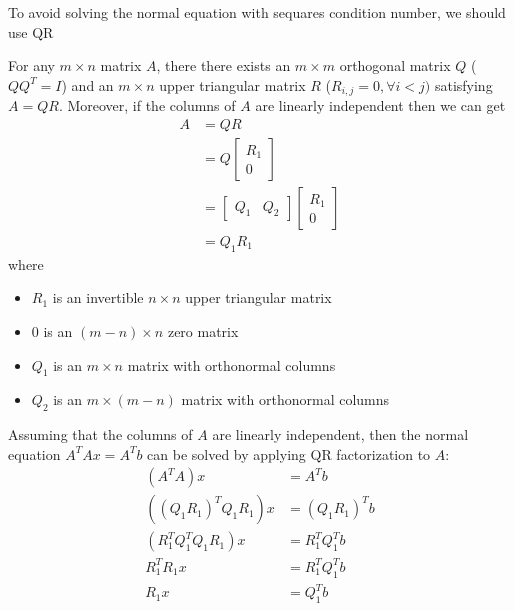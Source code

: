   To avoid solving the normal equation with sequares condition number, we should use QR
  
  
  

  
\begin{definition}[QR Factorization]
  For any $m \times n$ matrix $A$, there there exists an $m \times m$ orthogonal matrix $Q$ ($QQ^T = I$) and an $m \times n$ upper triangular matrix $R$ ($R_{i,j} = 0, \forall i < j)$ satisfying $A = QR$. Moreover, if the columns of $A$ are linearly independent then we can get
  \begin{align*}
    A &= QR \\
    &= Q \begin{bmatrix}
      R_1 \\ 0
    \end{bmatrix} \\
    &= \begin{bmatrix}
      Q_1 & Q_2
    \end{bmatrix} \begin{bmatrix}
      R_1 \\ 0
    \end{bmatrix} \\
    &= Q_1R_1
  \end{align*}
  where 
  \begin{itemize}
    \item $R_1$ is an invertible $n \times n$ upper triangular matrix
    \item $0$ is an $(m - n) \times n$ zero matrix
    \item $Q_1$ is an $m \times n$ matrix with orthonormal columns
    \item $Q_2$ is an $m \times (m - n)$ matrix with orthonormal columns
  \end{itemize}
\end{definition}
\begin{theorem}
  Assuming that the columns of $A$ are linearly independent, then the normal equation $A^TAx = A^Tb$ can be solved by applying QR factorization to $A$:
  \begin{align*}
    (A^TA)x &= A^Tb \\
    ((Q_1R_1)^TQ_1R_1)x &= (Q_1R_1)^Tb \\
    (R_1^TQ_1^TQ_1R_1)x &= R_1^TQ_1^Tb \\
    R_1^TR_1x &= R_1^TQ_1^Tb \tag*{Since $Q_1$ is orthogonal}\\
    R_1x &= Q_1^Tb \tag*{Since $R_1$ is invertible}
  \end{align*}
\end{theorem}
